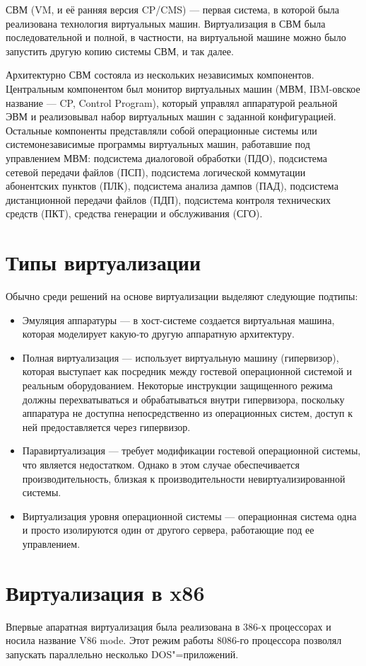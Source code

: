 \documentclass[10pt, a5paper]{article}
\begin{document}
СВМ (VM, и её ранняя версия CP/CMS) --- первая система, в которой была реализована технология виртуальных машин. Виртуализация в СВМ была последовательной и полной, в частности, на виртуальной машине можно было запустить другую копию системы СВМ, и так далее.

Архитектурно СВМ состояла из нескольких независимых компонентов. Центральным компонентом был монитор виртуальных машин (МВМ, IBM-овское название --- CP, Control Program), который управлял аппаратурой реальной ЭВМ и реализовывал набор виртуальных машин с заданной конфигурацией. Остальные компоненты представляли собой операционные системы или системонезависимые программы виртуальных машин, работавшие под управлением МВМ: подсистема диалоговой обработки (ПДО), подсистема сетевой передачи файлов (ПСП), подсистема логической коммутации абонентских пунктов (ПЛК), подсистема анализа дампов (ПАД), подсистема дистанционной передачи файлов (ПДП), подсистема контроля технических средств (ПКТ), средства генерации и обслуживания (СГО).

\section*{Типы виртуализации}
Обычно среди решений на основе виртуализации выделяют следующие подтипы:
\begin{itemize}
	\item Эмуляция аппаратуры --- в хост-системе создается виртуальная машина, которая моделирует какую-то другую аппаратную архитектуру.
	\item Полная виртуализация --- использует виртуальную машину (гипервизор), которая выступает как посредник между гостевой операционной системой и реальным оборудованием. Некоторые инструкции защищенного режима должны перехватываться и обрабатываться внутри гипервизора, поскольку аппаратура не доступна непосредственно из операционных систем, доступ к ней предоставляется через гипервизор.
	\item Паравиртуализация --- требует модификации гостевой операционной системы, что является недостатком. Однако в этом случае обеспечивается производительность, близкая к производительности невиртуализированной системы. 
	\item Виртуализация уровня операционной системы --- операционная система одна и просто изолируются один от другого сервера, работающие под ее управлением.
\end{itemize}

\section*{Виртуализация в x86}
Впервые апаратная виртуализация была реализована в 386-х процессорах и носила название V86 mode. Этот режим работы 8086-го процессора позволял запускать параллельно несколько DOS"=приложений.
\end{document}

